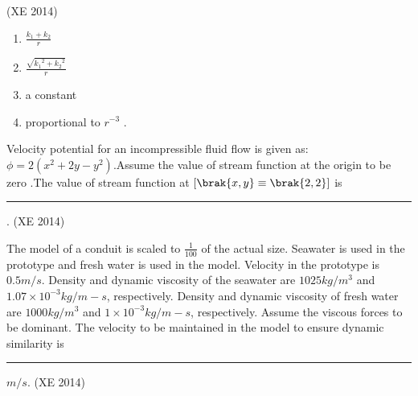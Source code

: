 \hfill{(XE 2014)}
\begin{multicols}{4}
\begin{enumerate}

\item $\frac{k_1 + k_2}{r}$
\item $\frac{\sqrt{{k_1}^2 + {k_2}^2}}{r}$
\item a constant
\item proportional to $r^{-3}$ .

\end{enumerate}
\end{multicols}

\item Velocity potential for an incompressible fluid flow is given as: $ \phi = 2(x^2 + 2y - y^2)$.Assume the 
value of stream function at the origin to be zero .The value of stream function at $[\brak{x,y} \equiv \brak{2,2}]$ is \rule{2cm}{0.4pt} .
\hfill{(XE 2014)}

\item The model of a conduit is scaled to $\frac{1}{100}$ of the actual size. Seawater is used in the prototype and fresh water is used in the model. Velocity in the prototype is $0.5 m/s$. Density and dynamic viscosity of the seawater are $1025 kg/m^3$ and $1.07 \times 10^{-3} kg/m-s$, respectively. Density and dynamic viscosity of fresh water are $1000 kg/m^{3}$ and $1 \times 10^{-3} kg/m-s$, respectively. Assume the viscous forces to be dominant. The velocity to be maintained in the model to ensure dynamic similarity is \rule{2cm}{0.4pt} $m/s$. 
\hfill{(XE 2014)}

